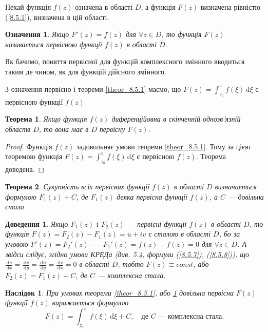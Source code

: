 \documentclass[12pt,fleqn]{article}
\theoremstyle{theorem}
\newtheorem{thm}{Теорема}[section]
\newtheorem{ozn}{Означення}[section]
\theoremstyle{proof}
\newtheorem*{dov}{Доведення}
\newtheorem{corollary}{Наслідок}[section]
\numberwithin{figure}{section}
\numberwithin{equation}{section}
\begin{document}
Нехай функція $f(z)$ означена в області $D$, а функція $F(z)$ визначена рівністю (\ref{8.5.1}),  визначена в цій області.

\begin{ozn}
Якщо $F'(z)=f(z)$ для $\forall z\in D$, то функція $F(z)$ називається первісною функції $f(z)$ в області $D$.
\end{ozn}

Як бачимо, поняття первісної для функцій комплексного змінного вводиться таким де чином, як для функцій дійсного змінного.

З означення первісно і теореми \ref{theor_8.5.1} маємо, що $F(z)= \int_{z_0}^{z} f(\xi) \,\mathrm{d}\xi$ є первісною функції $f(z)$

\begin{thm}\label{theor_8.5.2}
Якщо функція $f(z)$ диференційовна в скінченній однозв'язній областв $D$, то вона має в $D$ первісну $F(z)$.
\end{thm}

\begin{proof}
Функція $f(z)$ задовольняє умови теореми \ref{theor_8.5.1}. Тому за цією теоремою функція $F(z)= \int_{z_0}^{z} f(\xi) \,\mathrm{d}\xi$ є первісною $f(z)$. Теорема доведена.
\end{proof}

\begin{thm}\label{theor_8.5.3}
Сукупність всіх первісних функції $f(z)$ в області $D$ визначається формулою $F_1(z)+C$, де $F_1(z)$ деяка первісна функції $f(z)$, а $C$ --- довільна стала
\end{thm}

\begin{dov}
Якщо $F_1(z)$ і $F_2(z)$ --- первісні функції $f(z)$ в області $D$, то функція $F(z)=F_2(z)-F_1(z)=u+iv$ є сталою в області $D$, бо за умовою $F'(z)=F_2'(z)- -F_1'(z)=f(z)-f(z)=0$ для $\forall z \in D$. А звідси слідує, згідно умови \emph{КРЕДа} (див. 5.4, формули (\ref{8.5.7}), (\ref{8.5.8})), що $\frac{\,\mathrm{d}u}{\,\mathrm{d}x}=\frac{\,\mathrm{d}v}{\,\mathrm{d}y}=\frac{\,\mathrm{d}u}{\,\mathrm{d}y}=\frac{\,\mathrm{d}v}{\,\mathrm{d}x}=0$ в області $D$, тобто $F(z)\equiv const$, або $F_2(z)=F_1(z)+C$, де $C$ --- комплексна стала.
\end{dov}

\begin{corollary}\label{corollary_8.5.1}
При умовах теореми \ref{theor_8.5.1}, або \ref{theor_8.5.2} довільна первісна $F(z)$ функції $f(z)$ виражається формулою
\begin{equation}\label{8.5.6}
F(z)= \int_{z_0}^{z}f(\xi)\,\mathrm{d}\xi + C, \quad \text{де $C$ --- комплексна стала.}
\end{equation}
\end{corollary}
\end{document}
